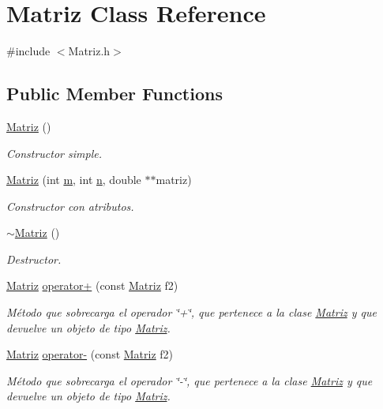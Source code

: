 \hypertarget{class_matriz}{\section{Matriz Class Reference}
\label{class_matriz}
}


{\ttfamily \#include $<$Matriz.\+h$>$}

\subsection*{Public Member Functions}
\begin{DoxyCompactItemize}
\item 
\hyperlink{class_matriz_a7de756301bddbc4b0b5d2a0f2b1fc695}{Matriz} ()
\begin{DoxyCompactList}\small\item\em Constructor simple. \end{DoxyCompactList}\item 
\hyperlink{class_matriz_a8a4293f800d43826bd4eaab58317613a}{Matriz} (int \hyperlink{class_matriz_a7141f8b75ce8aa34bded24988fd30998}{m}, int \hyperlink{class_matriz_a3b5041f8eaee4aa3ef646378f0dd2d6d}{n}, double $\ast$$\ast$matriz)
\begin{DoxyCompactList}\small\item\em Constructor con atributos. \end{DoxyCompactList}\item 
\hyperlink{class_matriz_a2092b7a289ecec369e1da407d5839f5a}{$\sim$\+Matriz} ()
\begin{DoxyCompactList}\small\item\em Destructor. \end{DoxyCompactList}\item 
\hyperlink{class_matriz}{Matriz} \hyperlink{class_matriz_ac31eefc8b92f8c69dcedf44bd95e419a}{operator+} (const \hyperlink{class_matriz}{Matriz} f2)
\begin{DoxyCompactList}\small\item\em Método que sobrecarga el operador \char`\"{}+\char`\"{}, que pertenece a la clase \hyperlink{class_matriz}{Matriz} y que devuelve un objeto de tipo \hyperlink{class_matriz}{Matriz}. \end{DoxyCompactList}\item 
\hyperlink{class_matriz}{Matriz} \hyperlink{class_matriz_a51f5b360494aca1f85432aa785feae3f}{operator-\/} (const \hyperlink{class_matriz}{Matriz} f2)
\begin{DoxyCompactList}\small\item\em Método que sobrecarga el operador \char`\"{}-\/\char`\"{}, que pertenece a la clase \hyperlink{class_matriz}{Matriz} y que devuelve un objeto de tipo \hyperlink{class_matriz}{Matriz}. \end{DoxyCompactList}\item 
$$
\end{DoxyCompactItemize}
